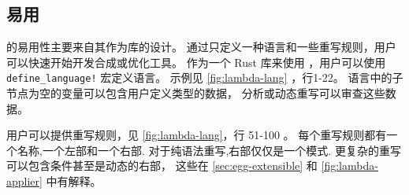\subsection{易用}
\label{sec:egg-easy}



\egg 的易用性主要来自其作为库的设计。
通过只定义一种语言和一些重写规则，用户可以快速开始开发合成或优化工具。
作为一个 Rust 库来使用 \egg ，用户可以使用 \texttt{define\_language!} 宏定义语言。
  示例见 \autoref{fig:lambda-lang} ，行1-22。
语言中的子节点为空的变量可以包含用户定义类型的数据，
  \eclass 分析或动态重写可以审查这些数据。 %


用户可以提供重写规则，见 \autoref{fig:lambda-lang}，行 51-100 。
每个重写规则都有一个名称,一个左部和一个右部.
对于纯语法重写,右部仅仅是一个模式.
更复杂的重写可以包含条件甚至是动态的右部，
  这些在 \autoref{sec:egg-extensible} 和 \autoref{fig:lambda-applier} 中有解释。

